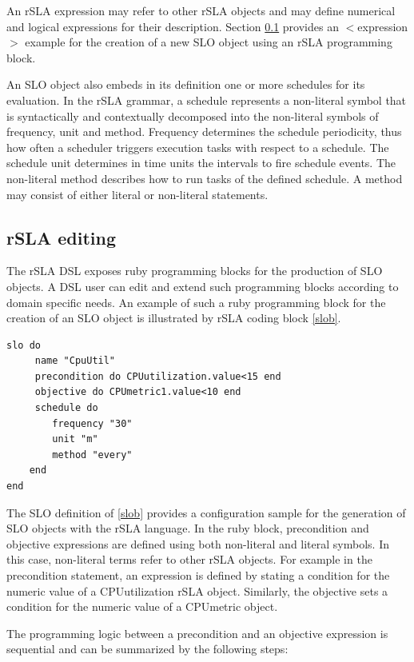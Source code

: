 An rSLA expression may refer to other rSLA objects and may define numerical and logical expressions for their description. Section \ref{editing} provides an $<$expression$>$ example for the creation of a new SLO object using an rSLA programming block.

An SLO object also embeds in its definition one or more schedules for its evaluation. In the rSLA grammar, a schedule represents a non-literal symbol that is syntactically and contextually decomposed into the non-literal symbols of frequency, unit and method. Frequency determines the schedule periodicity, thus how often a scheduler triggers execution tasks with respect to a schedule. The schedule unit determines in time units the intervals to fire schedule events. The non-literal method describes how to run tasks of the defined schedule. A method may consist of either literal or non-literal statements.

\subsection{rSLA editing}\label{editing}

The rSLA DSL exposes ruby programming blocks for the production of SLO objects. A DSL user can edit and extend such programming blocks according to domain specific needs. An example of such a ruby programming block for the creation of an SLO object is illustrated by rSLA coding block \ref{slob}.
\begin{lstlisting}[caption=SLO definition, label=slob]
slo do
     name "CpuUtil"
     precondition do CPUutilization.value<15 end
     objective do CPUmetric1.value<10 end
     schedule do
      	frequency "30"
    	unit "m"
    	method "every"
    end
end	
\end{lstlisting}

The SLO definition of \ref{slob} provides a configuration sample for the generation of SLO objects with the rSLA language. In the ruby block, precondition and objective expressions are defined using both non-literal and literal symbols. In this case, non-literal terms refer to other rSLA objects. For example in the precondition statement, an expression is defined by stating a condition for the numeric value of a CPUutilization rSLA object. Similarly, the objective sets a condition for the numeric value of a CPUmetric object.

The programming logic between a precondition and an objective expression is sequential and can be summarized by the following steps:

